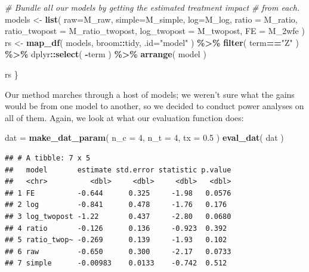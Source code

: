 \documentclass[
]{book}
\newenvironment{Shaded}{\begin{snugshade}}{\end{snugshade}}
\newcommand{\AttributeTok}[1]{\textcolor[rgb]{0.13,0.29,0.53}{#1}}
\newcommand{\CommentTok}[1]{\textcolor[rgb]{0.56,0.35,0.01}{\textit{#1}}}
\newcommand{\DecValTok}[1]{\textcolor[rgb]{0.00,0.00,0.81}{#1}}
\newcommand{\FloatTok}[1]{\textcolor[rgb]{0.00,0.00,0.81}{#1}}
\newcommand{\FunctionTok}[1]{\textcolor[rgb]{0.13,0.29,0.53}{\textbf{#1}}}
\newcommand{\NormalTok}[1]{#1}
\newcommand{\OtherTok}[1]{\textcolor[rgb]{0.56,0.35,0.01}{#1}}
\newcommand{\SpecialCharTok}[1]{\textcolor[rgb]{0.81,0.36,0.00}{\textbf{#1}}}
\newcommand{\StringTok}[1]{\textcolor[rgb]{0.31,0.60,0.02}{#1}}
\begin{document}
\begin{Shaded}
\begin{Highlighting}[]
    \CommentTok{\# Bundle all our models by getting the estimated treatment impact}
    \CommentTok{\# from each.}
\NormalTok{    models }\OtherTok{\textless{}{-}} \FunctionTok{list}\NormalTok{( }\AttributeTok{raw=}\NormalTok{M\_raw, }\AttributeTok{simple=}\NormalTok{M\_simple,}
                       \AttributeTok{log=}\NormalTok{M\_log, }\AttributeTok{ratio =}\NormalTok{ M\_ratio, }
                       \AttributeTok{ratio\_twopost =}\NormalTok{ M\_ratio\_twopost,}
                       \AttributeTok{log\_twopost =}\NormalTok{ M\_twopost, }
                       \AttributeTok{FE =}\NormalTok{ M\_2wfe )}
\NormalTok{    rs }\OtherTok{\textless{}{-}} \FunctionTok{map\_df}\NormalTok{( models, broom}\SpecialCharTok{::}\NormalTok{tidy, }\AttributeTok{.id=}\StringTok{"model"}\NormalTok{ ) }\SpecialCharTok{\%\textgreater{}\%}
        \FunctionTok{filter}\NormalTok{( term}\SpecialCharTok{==}\StringTok{"Z"}\NormalTok{ ) }\SpecialCharTok{\%\textgreater{}\%}
\NormalTok{        dplyr}\SpecialCharTok{::}\FunctionTok{select}\NormalTok{( }\SpecialCharTok{{-}}\NormalTok{term ) }\SpecialCharTok{\%\textgreater{}\%}
      \FunctionTok{arrange}\NormalTok{( model )}
    
\NormalTok{    rs}
\NormalTok{\}}
\end{Highlighting}
\end{Shaded}

Our method marches through a host of models; we weren't sure what the gains would be from one model to another, so we decided to conduct power analyses on all of them.
Again, we look at what our evaluation function does:

\begin{Shaded}
\begin{Highlighting}[]
\NormalTok{dat }\OtherTok{=} \FunctionTok{make\_dat\_param}\NormalTok{( }\AttributeTok{n\_c =} \DecValTok{4}\NormalTok{, }\AttributeTok{n\_t =} \DecValTok{4}\NormalTok{, }\AttributeTok{tx =} \FloatTok{0.5}\NormalTok{ )}
\FunctionTok{eval\_dat}\NormalTok{( dat )}
\end{Highlighting}
\end{Shaded}

\begin{verbatim}
## # A tibble: 7 x 5
##   model       estimate std.error statistic p.value
##   <chr>          <dbl>     <dbl>     <dbl>   <dbl>
## 1 FE          -0.644      0.325     -1.98   0.0576
## 2 log         -0.841      0.478     -1.76   0.176 
## 3 log_twopost -1.22       0.437     -2.80   0.0680
## 4 ratio       -0.126      0.136     -0.923  0.392 
## 5 ratio_twop~ -0.269      0.139     -1.93   0.102 
## 6 raw         -0.650      0.300     -2.17   0.0733
## 7 simple      -0.00983    0.0133    -0.742  0.512
\end{verbatim}
\end{document}
